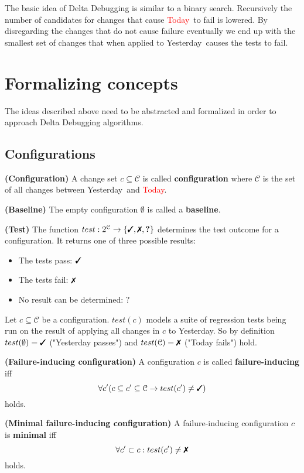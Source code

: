 \documentclass[a4paper,UKenglish]{lipics-v2018}
\newcommand{\green}[1]{\textcolor{td-green}{#1}}
\newcommand{\red}[1]{\textcolor{red}{#1}}
\newcommand{\yd}[0]{\green{Yesterday}}
\newcommand{\td}[0]{\red{Today}}
\newcommand{\C}[0]{\ensuremath{\mathcal{C}}}
\newcommand{\cmark}{\text{\ding{51}}}
\newcommand{\xmark}{\text{\ding{55}}}
\newcommand{\qmark}{\textbf{?}}
\newcommand{\defsub}[1]{\textbf{(#1)} }
\newcommand{\set}[1]{\left \{ #1 \right \}}
\begin{document}
The basic idea of Delta Debugging is similar to a binary search. Recursively the number of candidates for changes that cause \td\ to fail is lowered. By disregarding the changes that do not cause failure eventually we end up with the smallest set of changes that when applied to \yd\ causes the tests to fail. 



\section{Formalizing concepts}
\label{sec:formalizing_concepts}

The ideas described above need to be abstracted and formalized in order to approach Delta Debugging algorithms.

\subsection{Configurations}

 \defsub{Configuration} A change set $c \subseteq \C$ is called \textbf{configuration} where $\C$ is the set of all changes between \yd\ and \td.

 \defsub{Baseline} The empty configuration $\emptyset$ is called a \textbf{baseline}.

 \defsub{Test} The function $test: 2^{\C} \to \set{\cmark, \xmark, \qmark}$ determines the test outcome for a configuration. It returns one of three possible results: 
\begin{itemize}
	\item The tests pass: $\cmark$
	\item The tests fail: $\xmark$
	\item No result can be determined: $\qmark$
\end{itemize} 

Let $c \subseteq \C$ be a configuration. $test(c)$ models a suite of regression tests being run on the result of applying all changes in $c$ to \yd. So by definition $test(\emptyset) = \cmark$ ("Yesterday passes") and $test(\C) = \xmark$ ("Today fails") hold.

 \defsub{Failure-inducing configuration} A configuration $c$ is called \textbf{failure-inducing} iff 
\[ \forall c' (c \subseteq c' \subseteq \C \rightarrow test(c') \ne \cmark) \] 
holds.

 \defsub{Minimal failure-inducing configuration} A failure-inducing configuration $c$ is \textbf{minimal} iff 
\[ \forall c' \subset c: test(c') \ne \xmark \]
holds.\\
\end{document}
